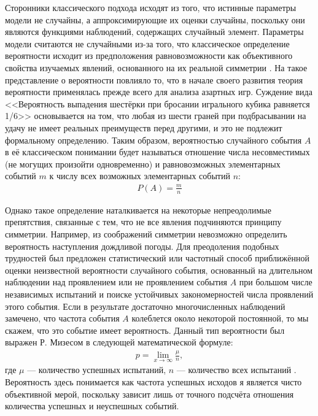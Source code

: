 Сторонники классического подхода исходят из того, что истинные параметры модели не случайны, а аппроксимирующие их оценки случайны, поскольку они являются функциями наблюдений, содержащих случайный элемент. \cite[стр. 5-6]{Zellner1980} Параметры модели считаются не случайными из-за того, что классическое определение вероятности исходит из предположения равновозможности как объективного свойства изучаемых явлений, основанного на их реальной симметрии \cite[стр. 24]{Gnedenko2005}. На такое представление о вероятности повлияло то, что в начале своего развития теория вероятности применялась прежде всего для анализа азартных игр. Суждение вида <<Вероятность выпадения шестёрки при бросании игрального кубика равняется 1/6>> основывается на том, что любая из шести граней при подбрасывании на удачу не имеет реальных преимуществ перед другими, и это не подлежит формальному определению. Таким образом, вероятностью случайного события $A$ в её классическом понимании будет называться отношение числа несовместимых (не могущих произойти одновременно) и равновозможных элементарных событий $m$ к числу всех возможных элементарных событий $n$:
\begin{eqnarray}
P(A)=\frac{m}{n}
\end{eqnarray}

Однако такое определение наталкивается на некоторые непреодолимые препятствия, связанные с тем, что не все явления подчиняются принципу симметрии. Например, из соображений симметрии невозможно определить вероятность наступления дождливой погоды. Для преодоления подобных трудностей был предложен статистический или частотный способ приближённой оценки неизвестной вероятности случайного события, основанный на длительном наблюдении над проявлением или не проявлением события $A$ при большом числе независимых испытаний и поиске устойчивых закономерностей числа проявлений этого события. Если в результате достаточно многочисленных наблюдений замечено, что частота события $A$ колеблется около некоторой постоянной, то мы скажем, что это событие имеет вероятность. Данный тип вероятности был выражен Р. Мизесом в следующей математической формуле:
\begin{eqnarray}
p=\lim_{x\to\infty}\frac{\mu}{n},
\end{eqnarray}
где $\mu$ --- количество успешных испытаний, $n$ --- количество всех испытаний \cite[стр. 46-47]{Gnedenko2005}. Вероятность здесь понимается как частота успешных исходов я является чисто объективной мерой, поскольку зависит лишь от точного подсчёта отношения количества успешных и неуспешных событий. 


